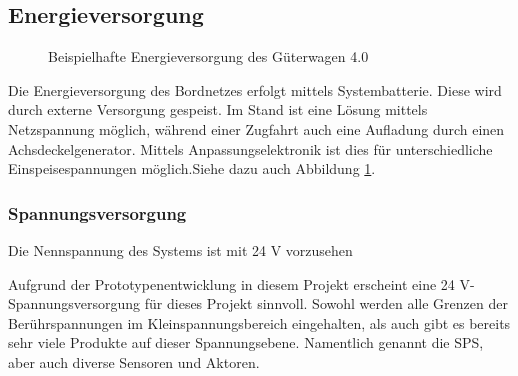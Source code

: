 \subsection{Energieversorgung}\label{sec:EV}\begin{figure}[htp]
    \centering
    
    \caption{Beispielhafte Energieversorgung des Güterwagen 4.0}
    \label{fig:Soll-EV}
\end{figure}
Die Energieversorgung des Bordnetzes erfolgt mittels Systembatterie. Diese wird durch externe Versorgung gespeist. Im Stand ist eine Lösung mittels Netzspannung möglich, während einer Zugfahrt auch eine Aufladung durch einen Achsdeckelgenerator. Mittels Anpassungselektronik ist dies für unterschiedliche Einspeisespannungen möglich.Siehe dazu auch Abbildung \ref{fig:Soll-EV}. 

\subsubsection{Spannungsversorgung}
\begin{feat}
Die Nennspannung des Systems ist mit 24 V vorzusehen
\end{feat}
\begin{rem}[zu Anf. 9]
Aufgrund der Prototypenentwicklung in diesem Projekt erscheint eine 24 V-Spannungsversorgung für dieses Projekt sinnvoll. Sowohl werden alle Grenzen der Berührspannungen im Kleinspannungsbereich eingehalten, als auch gibt es bereits sehr viele Produkte auf dieser Spannungsebene. Namentlich genannt die SPS, aber auch diverse Sensoren und Aktoren.
\end{rem}
